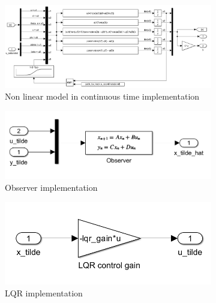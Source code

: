 \begin{figure}[H]
    \centering
         \begin{subfigure}[b]{0.8\textwidth}
         \centering
         \includegraphics[width=\textwidth]{Latex report/image/nonLinModelContinousTimeEx2.png}
         \caption{Non linear model in continuous time implementation}
         \label{fig:nonLinSimulinkex2}
     \end{subfigure}
     \begin{subfigure}[b]{0.45\textwidth}
         \centering
         \includegraphics[width=\textwidth]{Latex report/image/ex2Observer.png}
         \caption{Observer implementation}
         \label{fig:ObsSim}
     \end{subfigure}
     \begin{subfigure}[b]{0.45\textwidth}
         \centering
         \includegraphics[width=\textwidth]{Latex report/image/Ex2LQR.png}
         \caption{LQR implementation}
         \label{fig:lqrSim}
     \end{subfigure}
     \begin{subfigure}[b]{0.45\textwidth}

\end{subfigure}
\end{figure}
